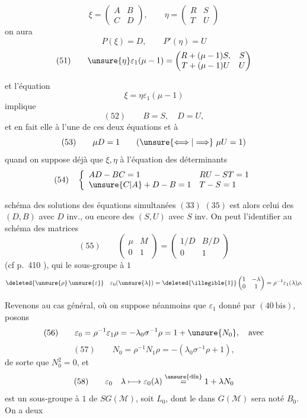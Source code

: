 \[
\xi=\begin{pmatrix}A&B\\C&D\end{pmatrix},\qquad
\eta=\begin{pmatrix}R&S\\T&U\end{pmatrix}
\]
on aura
\[
P(\xi)=D,\qquad P'(\eta)=U
\]
\[
(51)\qquad
\unsure{\eta}\varepsilon_1(\mu-1)
=\begin{pmatrix}
R+(\mu-1)S,&S\\
T+(\mu-1)U&U
\end{pmatrix}
\]


et l'équation
\[
\xi=\eta\varepsilon_1(\mu-1)
\]
 implique
\[
(52)\qquad B=S,\quad D=U,
\]
et en fait elle  à l'une de ces deux équations et à
\[
(53)\qquad \mu D=1\qquad (\unsure{\Longleftrightarrow|\Longrightarrow}\ \mu U=1)
\]
quand on suppose déjà que $\xi,\eta$  à l'équation des  déterminants 
\[
(54)\quad
\left\{\begin{array}{ll}
AD-BC=1 & RU-ST=1\\
\unsure{C|A}+D-B=1 & T-S=1
\end{array}\right.
\]

  schéma des solutions des équations simultanées $(33)$  $(35)$ est alors celui des $(D,B)$ avec $D$ inv., ou encore des $(S,U)$ avec $S$ inv. On peut l'identifier au schéma des matrices
\[
(55)\qquad
\begin{pmatrix}\mu&M\\0&1\end{pmatrix}
=\begin{pmatrix}1/D&B/D\\0&1\end{pmatrix}
\]
(cf p.~410 ), qui  le sous-groupe à $1$ 
\[
\deleted{\unsure{\rho}\,\unsure{\varepsilon}}\quad
\varepsilon_0(\unsure{\lambda})=\deleted{\illegible{1}}
\begin{pmatrix}1&-\lambda\\0&1\end{pmatrix}
=\rho^{-1}\varepsilon_1(\lambda)\rho.
\]



Revenons au cas général, où on suppose néanmoins que $\varepsilon_1$ donné par $(40\ \mathrm{bis})$,  posons
\[
(56)\qquad \varepsilon_0=\rho^{-1}\varepsilon_1\rho
=-\lambda_0\sigma^{-1}\rho=1+\unsure{N_0},\quad\text{avec}
\]
\[
(57)\qquad N_0=\rho^{-1}N_1\rho=-(\lambda_0\sigma^{-1}\rho+1),
\]
de sorte que $N_0^2=0$, et
\[
(58)\qquad \varepsilon_0\quad\lambda\longmapsto
\varepsilon_0(\lambda)\overset{\unsure{\mathrm{dfn}}}{=}1+\lambda N_0
\]
est un sous-groupe à $1$  de $SG(\mathcal M)$, soit $L_0$, dont le  dans $G(\mathcal M)$ sera noté $B_0$. On a deux 

